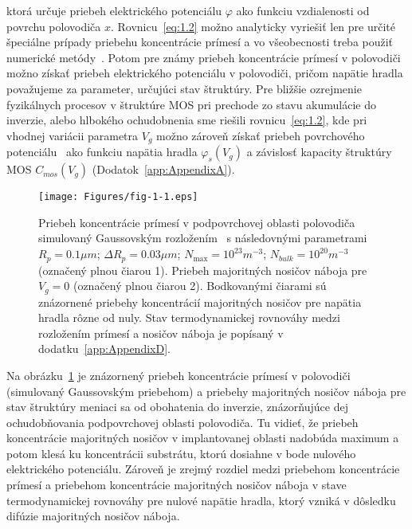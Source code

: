 ktorá určuje priebeh elektrického potenciálu $\varphi$ ako funkciu
vzdialenosti od povrchu polovodiča $x$. Rovnicu~\ref{eq:1.2} možno
analyticky vyriešiť len pre určité špeciálne prípady priebehu
koncentrácie prímesí a vo všeobecnosti treba použiť numerické
metódy~\cite{1.9,1.10}. Potom pre známy priebeh koncentrácie prímesí v
polovodiči možno získať priebeh elektrického potenciálu v polovodiči,
pričom napätie hradla považujeme za parameter, určujúci stav
štruktúry. Pre bližšie ozrejmenie fyzikálnych procesov v štruktúre MOS
pri prechode zo stavu akumulácie do inverzie, alebo hlbokého
ochudobnenia sme riešili rovnicu~\ref{eq:1.2}, kde pri vhodnej
variácii parametra $V_g$ možno zároveň získať priebeh povrchového
potenciálu~ ako funkciu napätia hradla
$\varphi_{s}(V_g)$ a závislosť kapacity štruktúry MOS $C_{mos}(V_g)$
(Dodatok~\ref{app:AppendixA}).

\begin{figure}[h!]\centering
  \texttt{[image: Figures/fig-1-1.eps]}%
  \caption[Priebeh koncentrácie prímesí v podpovrchovej oblasti
    polovodiča]{Priebeh koncentrácie prímesí v podpovrchovej oblasti
    polovodiča simulovaný Gaussovským rozložením~\cite{1.11} s
    následovnými parametrami $R_p=0.1 \mu{m}$; $\Delta{R_p}=0.03
    \mu{m}$; $N_{\max}=10^{23} m^{-3}$; $N_{bulk}=10^{20} m^{-3}$
    (označený plnou čiarou 1). Priebeh majoritných nosičov náboja pre
    $V_g=0$ (označený plnou čiarou 2). Bodkovanými čiarami sú
    znázornené priebehy koncentrácií majoritných nosičov pre napätia
    hradla rôzne od nuly. Stav termodynamickej rovnováhy medzi
    rozložením prímesí a nosičov náboja je popísaný v
    dodatku~\ref{app:AppendixD}.}\label{fig:1.1}
\end{figure}

\par Na obrázku~\ref{fig:1.1} je znázornený priebeh koncentrácie
prímesí v polovodiči (simulovaný Gaussovským priebehom) a priebehy
majoritných nosičov náboja pre stav štruktúry meniaci sa od obohatenia
do inverzie, znázorňujúce dej ochudobňovania podpovrchovej oblasti
polovodiča. Tu vidieť, že priebeh koncentrácie majoritných nosičov v
implantovanej oblasti nadobúda maximum a potom klesá ku koncentrácii
substrátu, ktorú dosiahne v bode nulového elektrického potenciálu.
Zároveň je zrejmý rozdiel medzi priebehom koncentrácie prímesí a
priebehom koncentrácie majoritných nosičov náboja v stave
termodynamickej rovnováhy pre nulové napätie hradla, ktorý vzniká v
dôsledku difúzie majoritných nosičov náboja.

